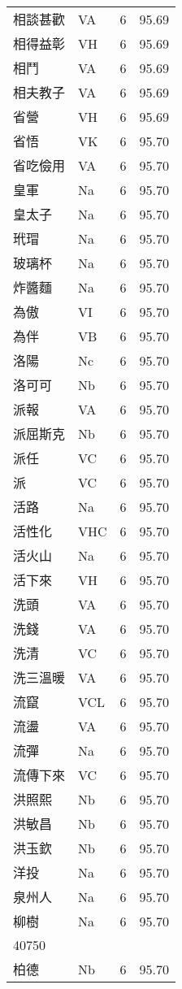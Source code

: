 \documentclass[twocolumn]{book}
\begin{document}
\begin{supertabular}{llrr}
相談甚歡 & VA & 6 &  95.69\\
相得益彰 & VH & 6 &  95.69\\
相鬥 & VA & 6 &  95.69\\
相夫教子 & VA & 6 &  95.69\\
省營 & VH & 6 &  95.69\\
省悟 & VK & 6 &  95.70\\
省吃儉用 & VA & 6 &  95.70\\
皇軍 & Na & 6 &  95.70\\
皇太子 & Na & 6 &  95.70\\
玳瑁 & Na & 6 &  95.70\\
玻璃杯 & Na & 6 &  95.70\\
炸醬麵 & Na & 6 &  95.70\\
為傲 & VI & 6 &  95.70\\
為伴 & VB & 6 &  95.70\\
洛陽 & Nc & 6 &  95.70\\
洛可可 & Nb & 6 &  95.70\\
派報 & VA & 6 &  95.70\\
派屈斯克 & Nb & 6 &  95.70\\
派任 & VC & 6 &  95.70\\
派 & VC & 6 &  95.70\\
活路 & Na & 6 &  95.70\\
活性化 & VHC & 6 &  95.70\\
活火山 & Na & 6 &  95.70\\
活下來 & VH & 6 &  95.70\\
洗頭 & VA & 6 &  95.70\\
洗錢 & VA & 6 &  95.70\\
洗清 & VC & 6 &  95.70\\
洗三溫暖 & VA & 6 &  95.70\\
流竄 & VCL & 6 &  95.70\\
流盪 & VA & 6 &  95.70\\
流彈 & Na & 6 &  95.70\\
流傳下來 & VC & 6 &  95.70\\
洪照熙 & Nb & 6 &  95.70\\
洪敏昌 & Nb & 6 &  95.70\\
洪玉欽 & Nb & 6 &  95.70\\
洋投 & Na & 6 &  95.70\\
泉州人 & Na & 6 &  95.70\\
柳樹 & Na & 6 &  95.70\\
40750\\
柏德 & Nb & 6 &  95.70\\

\end{supertabular}
\end{document}
